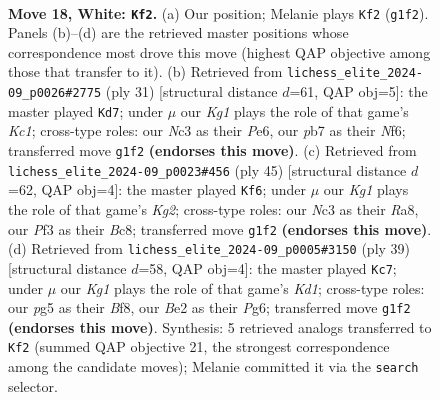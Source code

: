 \documentclass[11pt]{article}
\begin{document}
\begin{figure}[p]
\label{fig:thought-m32}
\end{figure}

\clearpage

\begin{figure}[p]\centering
\begin{subfigure}{0.46\textwidth}\centering
\resizebox{\linewidth}{!}{%
\newchessgame
\chessboard[
  setfen={r1b3k1/ppppnp1p/8/6p1/8/1PN2P2/P1PPB1PP/R5K1 w - - 0 18},
  showmover=false,
  pgfstyle=straightmove, color=movearrow, markmove={g1-f2}
]}
\caption{}
\end{subfigure}\hfill
\begin{subfigure}{0.46\textwidth}\centering
\resizebox{\linewidth}{!}{%
\newchessgame
\chessboard[
  setfen={2k4r/ppp3pp/3bpn2/8/8/2N1B2P/PPP1KPP1/7R b - - 0 16},
  showmover=false,
  pgfstyle=straightmove, color=movearrow, markmove={c8-d7}
]}
\caption{}
\end{subfigure}
\\[4pt]
\begin{subfigure}{0.46\textwidth}\centering
\resizebox{\linewidth}{!}{%
\newchessgame
\chessboard[
  setfen={r1b5/pp2n1k1/6pp/4Np2/2B5/2P5/PP3PPP/3R2K1 b - - 0 23},
  showmover=false,
  pgfstyle=straightmove, color=movearrow, markmove={g7-f6}
]}
\caption{}
\end{subfigure}\hfill
\begin{subfigure}{0.46\textwidth}\centering
\resizebox{\linewidth}{!}{%
\newchessgame
\chessboard[
  setfen={3k1b1r/pp2p2p/2n3p1/8/1PB5/2N1P3/P5PP/1R4K1 b - - 0 20},
  showmover=false,
  pgfstyle=straightmove, color=movearrow, markmove={d8-c7}
]}
\caption{}
\end{subfigure}
\caption{\textbf{Move 18, White: \texttt{Kf2}.} (a) Our position; Melanie plays \texttt{Kf2} (\texttt{g1f2}). Panels (b)--(d) are the retrieved master positions whose correspondence most drove this move (highest QAP objective among those that transfer to it). (b) Retrieved from \texttt{lichess\_elite\_2024-09\_p0026\#2775} (ply 31) [structural distance $d$=61, QAP obj=5]: the master played \texttt{Kd7}; under $\mu$ our \emph{Kg1} plays the role of that game's \emph{Kc1}; cross-type roles: our \emph{N}c3 as their \emph{P}e6, our \emph{p}b7 as their \emph{N}f6; transferred move \texttt{g1f2} \textbf{(endorses this move)}. (c) Retrieved from \texttt{lichess\_elite\_2024-09\_p0023\#456} (ply 45) [structural distance $d$=62, QAP obj=4]: the master played \texttt{Kf6}; under $\mu$ our \emph{Kg1} plays the role of that game's \emph{Kg2}; cross-type roles: our \emph{N}c3 as their \emph{R}a8, our \emph{P}f3 as their \emph{B}c8; transferred move \texttt{g1f2} \textbf{(endorses this move)}. (d) Retrieved from \texttt{lichess\_elite\_2024-09\_p0005\#3150} (ply 39) [structural distance $d$=58, QAP obj=4]: the master played \texttt{Kc7}; under $\mu$ our \emph{Kg1} plays the role of that game's \emph{Kd1}; cross-type roles: our \emph{p}g5 as their \emph{B}f8, our \emph{B}e2 as their \emph{P}g6; transferred move \texttt{g1f2} \textbf{(endorses this move)}. Synthesis: 5 retrieved analogs transferred to \texttt{Kf2} (summed QAP objective 21, the strongest correspondence among the candidate moves); Melanie committed it via the \texttt{search} selector.}

\end{figure}
\end{document}
